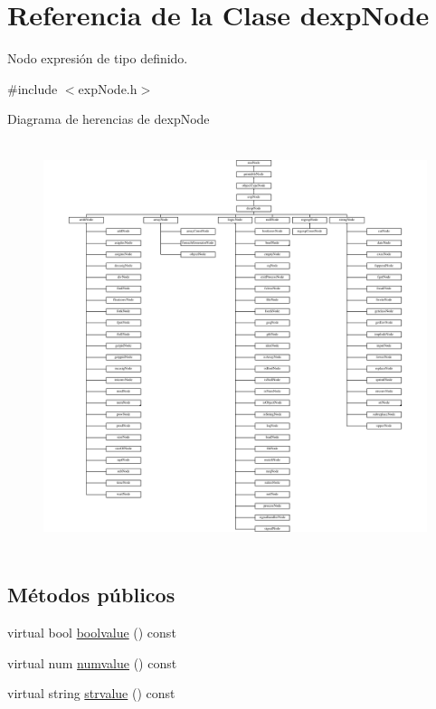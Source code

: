 \hypertarget{classdexpNode}{\section{Referencia de la Clase dexp\-Node}
\label{classdexpNode}
}


Nodo expresión de tipo definido.  




{\ttfamily \#include $<$exp\-Node.\-h$>$}

Diagrama de herencias de dexp\-Node\begin{figure}[H]
\begin{center}
\leavevmode
\includegraphics[height=12.000000cm]{classdexpNode}
\end{center}
\end{figure}
\subsection*{Métodos públicos}
\begin{DoxyCompactItemize}
\item 
virtual bool \hyperlink{classdexpNode_a18781e07cc3390c04b6905249755ccc8}{boolvalue} () const 
\item 
virtual num \hyperlink{classdexpNode_ae2d3bfed7e6ebd5e96ddcefaa230c3d2}{numvalue} () const 
\item 
virtual string \hyperlink{classdexpNode_adf74f4f848f7ec7c3c2ada1aa3bdc66d}{strvalue} () const 
\end{DoxyCompactItemize}
